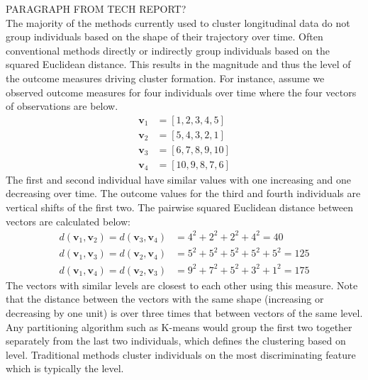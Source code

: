 \documentclass[12pt]{article}
\newcommand{\B}[0]{\mathbf}
\begin{document}
PARAGRAPH FROM TECH REPORT?\\

The majority of the methods currently used to cluster longitudinal data do not group individuals based on the shape of their trajectory over time. Often conventional methods directly or indirectly group individuals based on the squared Euclidean distance. This results in the magnitude and thus the level of the outcome measures driving cluster formation. For instance, assume we observed outcome measures for four individuals over time where the four vectors of observations are below.
\begin{align*}
\B v_{1}&=[1,2,3,4,5]\\
\B v_{2}&=[5,4,3,2,1]\\
\B v_{3}&=[6,7,8,9,10]\\
\B v_{4}&=[10,9,8,7,6]
\end{align*}
The first and second individual have similar values with one increasing and one decreasing over time. The outcome values for the third and fourth individuals are vertical shifts of the first two. The pairwise squared Euclidean distance between vectors are calculated below:
\begin{align*}
d(\B v_{1},\B v_{2}) = d(\B v_{3},\B v_{4}) &= 4^{2}+2^{2}+2^{2}+4^{2} = 40\\
d(\B v_{1},\B v_{3}) = d(\B v_{2},\B v_{4}) &= 5^{2}+5^{2}+5^{2}+5^{2}+5^{2}=125\\
d(\B v_{1},\B v_{4}) = d(\B v_{2},\B v_{3}) &= 9^{2}+7^{2}+5^{2}+3^{2}+1^{2}=175
\end{align*}
The vectors with similar levels are closest to each other using this measure. Note that the distance between the vectors with the same shape (increasing or decreasing by one unit) is over three times that between vectors of the same level. Any partitioning algorithm such as K-means would group the first two together separately from the last two individuals, which defines the clustering based on level. Traditional methods cluster individuals on the most discriminating feature which is typically the level.\\
\end{document}
